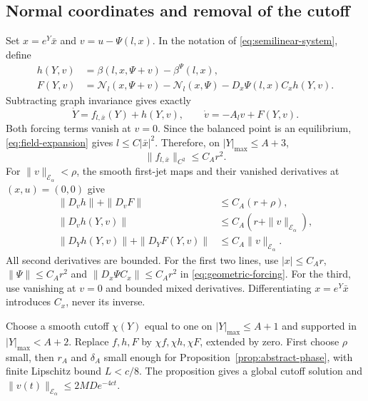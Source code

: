 \documentclass[11pt]{amsart}
\theoremstyle{definition}
\theoremstyle{remark}
\begin{document}
\subsection{Normal coordinates and removal of the cutoff}
Set $x=e^Y\bar x$ and $v=u-\Psi(l,x)$. In the notation of
\eqref{eq:semilinear-system}, define
\begin{equation}\label{eq:geometric-forcing}
 \begin{aligned}
 h(Y,v)&=\beta(l,x,\Psi+v)-\beta^\Psi(l,x),\\
 F(Y,v)&=\mathcal N_l(x,\Psi+v)-\mathcal N_l(x,\Psi)
                 -D_x\Psi(l,x)C_xh(Y,v).
 \end{aligned}
\end{equation}
Subtracting graph invariance gives exactly
\[
 \dot Y=f_{l,\bar x}(Y)+h(Y,v),\qquad
 \dot v=-A_lv+F(Y,v).
\]
Both forcing terms vanish at $v=0$. Since the balanced point
is an equilibrium, \eqref{eq:field-expansion} gives
$l\le C|\bar x|^2$. Therefore, on $|Y|_{\max}\le A+3$,
\begin{equation}\label{eq:small-finite-field}
 \|f_{l,\bar x}\|_{C^2}\le C_Ar^2.
\end{equation}
For $\|v\|_{\mathcal E_\alpha}<\rho$, the smooth first-jet maps
and their vanished derivatives at $(x,u)=(0,0)$ give
\begin{equation}\label{eq:forcing-estimates}
 \begin{aligned}
 \|D_vh\|+\|D_vF\|&\le C_A(r+\rho),\\
 \|D_vh(Y,v)\|&\le C_A(r+\|v\|_{\mathcal E_\alpha}),\\
 \|D_Yh(Y,v)\|+\|D_YF(Y,v)\|&\le C_A\|v\|_{\mathcal E_\alpha}.
 \end{aligned}
\end{equation}
All second derivatives are bounded. For the first two lines,
use $|x|\le C_Ar$, $\|\Psi\|\le C_Ar^2$ and
$\|D_x\Psi C_x\|\le C_Ar^2$ in \eqref{eq:geometric-forcing}.
For the third, use vanishing at $v=0$ and bounded mixed
derivatives. Differentiating $x=e^Y\bar x$ introduces $C_x$,
never its inverse.

Choose a smooth cutoff $\chi(Y)$ equal to one on
$|Y|_{\max}\le A+1$ and supported in $|Y|_{\max}<A+2$.
Replace $f,h,F$ by $\chi f,\chi h,\chi F$, extended by zero.
First choose $\rho$ small, then $r_A$ and $\delta_A$ small
enough for Proposition~\ref{prop:abstract-phase}, with finite
Lipschitz bound $L<c/8$. The proposition gives a global cutoff
solution and $\|v(t)\|_{\mathcal E_\alpha}\le2MD e^{-4ct}$.
\end{document}

